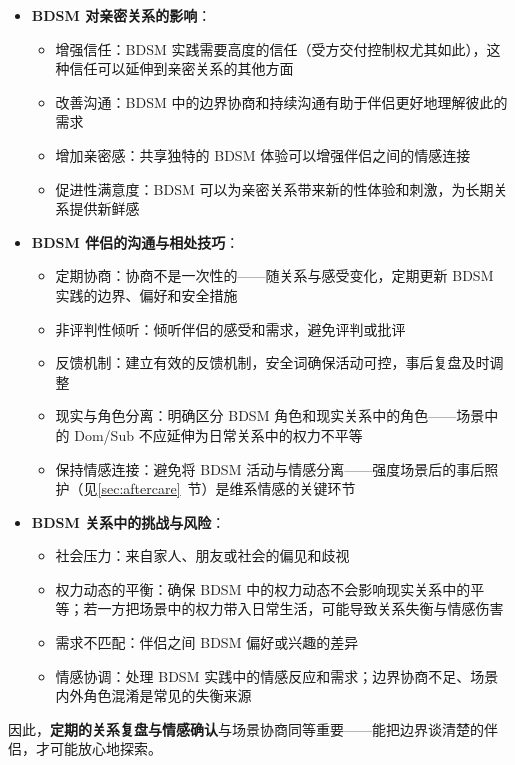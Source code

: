 \documentclass[12pt,UTF8]{ctexbook}
\begin{document}
  \begin{itemize}
  \item \textbf{BDSM 对亲密关系的影响}：
    \begin{itemize}
    \item 增强信任：BDSM 实践需要高度的信任（受方交付控制权尤其如此），这种信任可以延伸到亲密关系的其他方面
    \item 改善沟通：BDSM 中的边界协商和持续沟通有助于伴侣更好地理解彼此的需求
    \item 增加亲密感：共享独特的 BDSM 体验可以增强伴侣之间的情感连接
    \item 促进性满意度：BDSM 可以为亲密关系带来新的性体验和刺激，为长期关系提供新鲜感
    \end{itemize}
  \item \textbf{BDSM 伴侣的沟通与相处技巧}：
    \begin{itemize}
    \item 定期协商：协商不是一次性的——随关系与感受变化，定期更新 BDSM 实践的边界、偏好和安全措施
    \item 非评判性倾听：倾听伴侣的感受和需求，避免评判或批评
    \item 反馈机制：建立有效的反馈机制，安全词确保活动可控，事后复盘及时调整
    \item 现实与角色分离：明确区分 BDSM 角色和现实关系中的角色——场景中的 Dom/Sub 不应延伸为日常关系中的权力不平等
    \item 保持情感连接：避免将 BDSM 活动与情感分离——强度场景后的事后照护（见\ref{sec:aftercare}~节）是维系情感的关键环节
    \end{itemize}
  \item \textbf{BDSM 关系中的挑战与风险}：
    \begin{itemize}
    \item 社会压力：来自家人、朋友或社会的偏见和歧视
    \item 权力动态的平衡：确保 BDSM 中的权力动态不会影响现实关系中的平等；若一方把场景中的权力带入日常生活，可能导致关系失衡与情感伤害
    \item 需求不匹配：伴侣之间 BDSM 偏好或兴趣的差异
    \item 情感协调：处理 BDSM 实践中的情感反应和需求；边界协商不足、场景内外角色混淆是常见的失衡来源
    \end{itemize}
  \end{itemize}

因此，\textbf{定期的关系复盘与情感确认}与场景协商同等重要——能把边界谈清楚的伴侣，才可能放心地探索。
\end{document}
